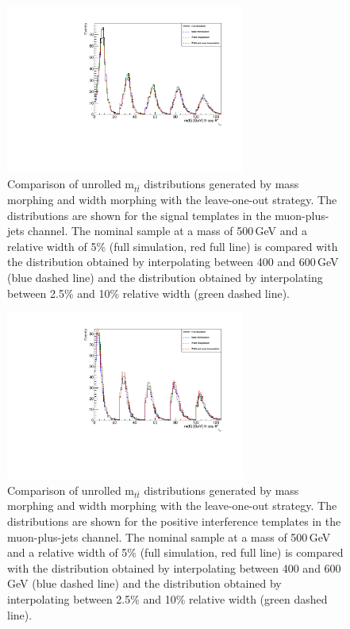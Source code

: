\begin{figure}[!Hhtb]
\centering
\includegraphics[width=0.7\textwidth,keepaspectratio=true]{fig/chapt8/morphing/mass_morph_mujets_pos-sgn-5pc-M500.pdf}
\caption{Comparison of unrolled m$_{t\bar t}$ distributions generated by mass morphing and width morphing with the leave-one-out strategy. The distributions are shown for the signal templates in the muon-plus-jets channel. The nominal sample at a mass of 500\,GeV and a relative width of 5\% (full simulation, red full line) is compared with the distribution obtained by interpolating between 400 and 600\,GeV (blue dashed line) and the distribution obtained by interpolating between 2.5\% and 10\% relative width (green dashed line).}
\label{fig:morph_mass_mu_sgn_500_5}
\end{figure}

\begin{figure}[!Hhtb]
\centering
\includegraphics[width=0.7\textwidth,keepaspectratio=true]{fig/chapt8/morphing/mass_morph_mujets_pos-int-5pc-M500.pdf}
\caption{Comparison of unrolled m$_{t\bar t}$ distributions generated by mass morphing and width morphing with the leave-one-out strategy. The distributions are shown for the positive interference templates in the muon-plus-jets channel. The nominal sample at a mass of 500\,GeV and a relative width of 5\% (full simulation, red full line) is compared with the distribution obtained by interpolating between 400 and 600\,GeV (blue dashed line) and the distribution obtained by interpolating between 2.5\% and 10\% relative width (green dashed line).}
\label{fig:morph_mass_mu_posint_500_5}
\end{figure}

